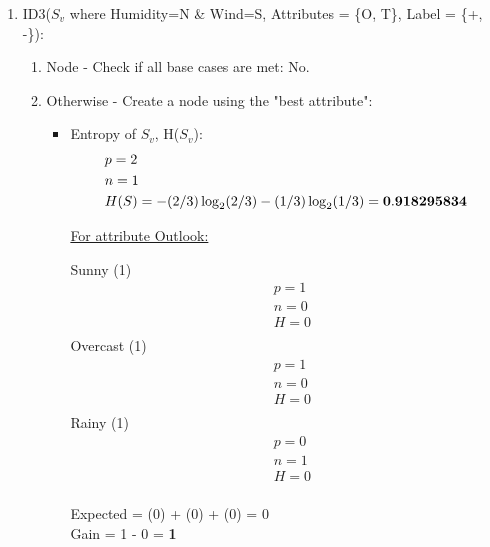 \documentclass[8pt, fullpage,letterpaper]{article}
\begin{document}
\begin{enumerate}
\begin{enumerate}
\begin{enumerate}
\begin{enumerate}
\begin{itemize}
					\centerline{}	
				\end{itemize}	
			\end{enumerate}

	 	\item ID3($S_v$ where Humidity=N \& Wind=S, Attributes = \{O, T\}, Label = \{+, -\}): 
			\begin{enumerate}
			\item Node - Check if all base cases are met: {\color{red} No}.
			\item Otherwise - Create a node using the "best attribute":
				\begin{itemize}
					\item Entropy of $S_v$, H($S_v$):
						\begin{align*}
						    	& p = 2\\
							& n = 1 \\
						    	& H(S) = - (2/3) \log_2 (2/3) - (1/3) \log_2 (1/3) = {\bf 0.918295834}
					      \end{align*}

						\underline {For attribute Outlook:} 
							\vspace{-5pt}
							\begin{multicols}{3}
								Sunny (1)
			 						\begin{align*}
									    	& p = 1\\
										& n = 0 \\
									    	& H = 0\\
								      \end{align*}
								Overcast (1)
			 						\begin{align*}
									    	& p = 1\\
										& n = 0 \\
									    	& H = 0\\
								      \end{align*}
								Rainy (1)
			 						\begin{align*}
									    	& p = 0\\
										& n = 1 \\
									    	& H = 0\\
								      \end{align*}
							\end{multicols}
							\vspace{-20pt}
							Expected = (0) + (0) + (0) = 0\\
							Gain = 1 - 0 = {\bf 1}\\


\end{itemize}
\end{enumerate}
\end{enumerate}
\end{enumerate}
\end{enumerate}
\end{document}
